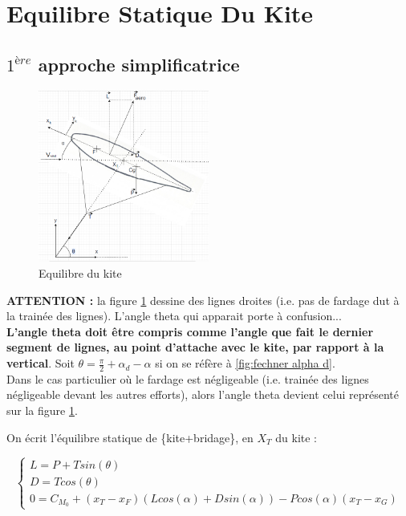 \section{\textbf{Equilibre Statique Du Kite}} 
\label{sec:Ch1.2}

\subsection{$1^{ère}$ approche simplificatrice} 
\label{subsec:Ch1.2.1}

\begin{figure}[H]
    \centering
    \includegraphics[width=0.5\textwidth]{Pics/01 - xt et towpoint/Equilibre Kite.png}  
    \caption{Equilibre du kite}
    \label{fig:Equilibre du kite}
\end{figure}

\textbf{ATTENTION :} la figure \ref{fig:Equilibre du kite} dessine des lignes droites (i.e. pas de fardage dut à la trainée des lignes). L'angle theta qui apparait porte à confusion...\\

\textbf{L'angle theta doit être compris comme l'angle que fait le dernier segment de lignes, au point d'attache avec le kite, par rapport à la vertical}. Soit $\theta = \frac{\pi}{2} + \alpha_d - \alpha$ si on se réfère à \ref{fig:fechner alpha d}.\\

Dans le cas particulier où le fardage est négligeable (i.e. trainée des lignes négligeable devant les autres efforts), alors l'angle theta devient celui représenté sur la figure \ref{fig:Equilibre du kite}.

On écrit l'équilibre statique de \{kite+bridage\}, en $X_T$ du kite : 

\begin{equation}
    \begin{cases}
        L = P + T sin(\theta) \\
        D = T cos(\theta) \\
        0 = C_{M_0} + (x_T - x_F) (L cos(\alpha) + D sin(\alpha)) - P cos(\alpha) (x_T - x_G)
    \end{cases}
\end{equation}


